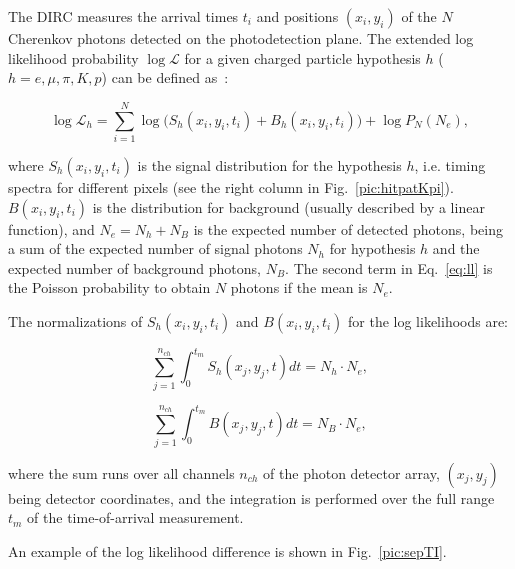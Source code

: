 The DIRC measures the arrival times $t_{i}$ and positions $(x_{i}, y_{i})$ of the $N$ Cherenkov photons detected on the photodetection plane. The extended log likelihood probability $\log\mathcal{L}$ for a given charged particle hypothesis $h$ ($h = e, \mu, \pi, K, p$) can be 
defined as~\cite{staric2}:

\begin{equation}
\log\mathcal{L}_{h} = \sum_{i=1}^{N} \log \Big( S_{h}(x_{i}, y_{i}, t_{i}) + B_{h}(x_{i}, y_{i}, t_{i}) \Big) + \log P_{N}(N_{e}),
\label{eq:ll}
\end{equation}

\noindent where $S_{h} (x_{i}, y_{i}, t_{i})$ is the signal distribution for the hypothesis $h$, i.e. timing spectra for different pixels (see the right column in Fig.~\ref{pic:hitpatKpi}). $B(x_{i}, y_{i}, t_{i})$ is the distribution for background (usually described by a linear function), and $N_{e} = N_{h} + N_{B}$ is the expected number of detected photons, being a sum of the expected number of signal photons $N_{h}$ for hypothesis $h$ and the expected number of background photons, $N_{B}$. The second term in Eq.~\ref{eq:ll} is the Poisson probability to obtain $N$ photons if the mean is $N_{e}$.

The normalizations of $S_{h} (x_{i}, y_{i}, t_{i})$ and $B(x_{i}, y_{i}, t_{i})$ for the log likelihoods are:

\begin{equation}
\sum_{j=1}^{n_{ch}} \int_{0}^{t_{m}} S_{h}(x_{j}, y_{j}, t) dt = N_{h}\cdot N_{e},
\label{eq:norm1}
\end{equation}

\begin{equation}
\sum_{j=1}^{n_{ch}} \int_{0}^{t_{m}} B(x_{j}, y_{j}, t) dt = N_{B} \cdot N_{e},
\label{eq:norm2}
\end{equation}

\noindent where the sum runs over all channels $n_{ch}$ of the photon detector array, $(x_{j}, y_{j})$ being detector coordinates, and the integration is performed over the full range $t_{m}$ of the time-of-arrival measurement.

An example of the log likelihood difference is shown in Fig.~\ref{pic:sepTI}.


